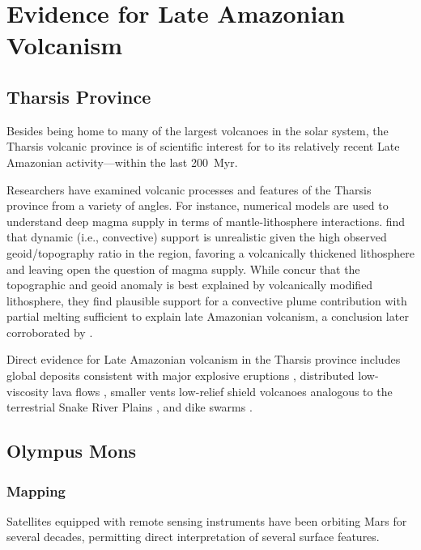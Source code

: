 \section{Evidence for Late Amazonian Volcanism}

\subsection{Tharsis Province}

Besides being home to many of the largest volcanoes in the solar system, the Tharsis volcanic province is of scientific interest for to its relatively recent Late Amazonian activity---within the last \qty{200}{Myr}.

Researchers have examined volcanic processes and features of the Tharsis province from a variety of angles. For instance, numerical models are used to understand deep magma supply in terms of mantle-lithosphere interactions. \textcite{roberts_plume-induced_2004} find that dynamic (i.e., convective) support is unrealistic given the high observed geoid/topography ratio in the region, favoring a volcanically thickened lithosphere and leaving open the question of magma supply. While \textcite{redmond_numerical_2004} concur that the topographic and geoid anomaly is best explained by volcanically modified lithosphere, they find plausible support for a convective plume contribution with partial melting sufficient to explain late Amazonian volcanism, a conclusion later corroborated by \textcite{plesa_thermal_2018}.

Direct evidence for Late Amazonian volcanism in the Tharsis province includes global deposits consistent with major explosive eruptions \parencite{hynek_explosive_2003}, distributed low-viscosity lava flows \parencite{hauber_very_2011}, smaller vents \parencite{wilson_fissure_2009,richardson_small_2021} low-relief shield volcanoes analogous to the terrestrial Snake River Plains \parencite{hauber_topography_2009}, and dike swarms \parencite{pieterek_late_2022}.

\subsection{Olympus Mons}

\subsubsection{Mapping}

Satellites equipped with remote sensing instruments have been orbiting Mars for several decades, permitting direct interpretation of several surface features.


